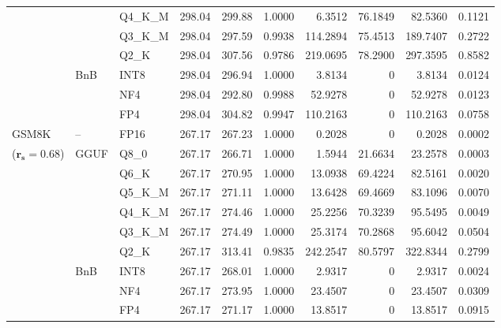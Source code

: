 \begin{longtable}{ll l rrrrrrr}
 &  & Q4\_K\_M & 298.04 & 299.88 & 1.0000 & 6.3512 & 76.1849 & 82.5360 & 0.1121 \\
 &  & Q3\_K\_M & 298.04 & 297.59 & 0.9938 & 114.2894 & 75.4513 & 189.7407 & 0.2722 \\
 &  & Q2\_K & 298.04 & 307.56 & 0.9786 & 219.0695 & 78.2900 & 297.3595 & 0.8582 \\
 & BnB & INT8 & 298.04 & 296.94 & 1.0000 & 3.8134 & \cellcolor{cyan!12} $0$ & 3.8134 & 0.0124 \\
 &  & NF4 & 298.04 & 292.80 & 0.9988 & 52.9278 & \cellcolor{cyan!12} $0$ & 52.9278 & 0.0123 \\
 &  & FP4 & 298.04 & 304.82 & 0.9947 & 110.2163 & \cellcolor{cyan!12} $0$ & 110.2163 & 0.0758 \\
\midrule
GSM8K & -- & FP16 & 267.17 & 267.23 & 1.0000 & 0.2028 & \cellcolor{cyan!12} $0$ & 0.2028 & 0.0002 \\
{\small ($\mathbf{r_s{=}0.68}$)} & GGUF & Q8\_0 & 267.17 & 266.71 & 1.0000 & 1.5944 & 21.6634 & 23.2578 & 0.0003 \\
 &  & Q6\_K & 267.17 & 270.95 & 1.0000 & 13.0938 & 69.4224 & 82.5161 & 0.0020 \\
 &  & Q5\_K\_M & 267.17 & 271.11 & 1.0000 & 13.6428 & 69.4669 & 83.1096 & 0.0070 \\
 &  & Q4\_K\_M & 267.17 & 274.46 & 1.0000 & 25.2256 & 70.3239 & 95.5495 & 0.0049 \\
 &  & Q3\_K\_M & 267.17 & 274.49 & 1.0000 & 25.3174 & 70.2868 & 95.6042 & 0.0504 \\
 &  & Q2\_K & 267.17 & 313.41 & 0.9835 & 242.2547 & 80.5797 & 322.8344 & 0.2799 \\
 & BnB & INT8 & 267.17 & 268.01 & 1.0000 & 2.9317 & \cellcolor{cyan!12} $0$ & 2.9317 & 0.0024 \\
 &  & NF4 & 267.17 & 273.95 & 1.0000 & 23.4507 & \cellcolor{cyan!12} $0$ & 23.4507 & 0.0309 \\
 &  & FP4 & 267.17 & 271.17 & 1.0000 & 13.8517 & \cellcolor{cyan!12} $0$ & 13.8517 & 0.0915 \\
\end{longtable}
\endgroup